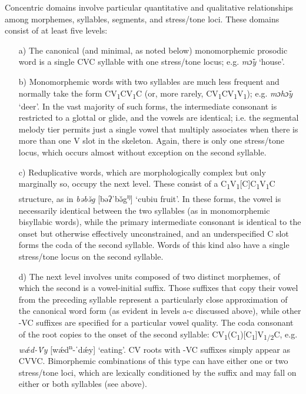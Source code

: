\documentclass[output=paper]{langscibook}
\begin{document}
Concentric domains involve particular quantitative and qualitative relationships among morphemes, syllables, segments, and stress/tone loci. These domains consist of at least five levels:
\begin{enumerate}
    \item[a)] The canonical (and minimal, as noted below) monomorphemic prosodic word is a single CVC syllable with one stress/tone locus; e.g. \textit{mɔ̌y} `house'.
    
    \item[b)] Monomorphemic words with two syllables are much less frequent and normally take the form CV\textsubscript{1}CV\textsubscript{1}C (or, more rarely, CV\textsubscript{1}CV\textsubscript{1}V\textsubscript{1}); e.g. \textit{mɔhɔ̌y} `deer'. In the vast majority of such forms, the intermediate consonant is restricted to a glottal or glide, and the vowels are identical; i.e. the segmental melody tier permits just a single vowel that multiply associates when there is more than one V slot in the skeleton. Again, there is only one stress/tone locus, which occurs almost without exception on the second syllable.
    
    \item[c)] Reduplicative words, which are morphologically complex but only mar\-gin\-ally so, occupy the next level. These consist of a C\textsubscript{1}V\textsubscript{1}[C]C\textsubscript{1}V\textsubscript{1}C structure, as in \textit{bǝbǝ̌g} [bǝʔˈbǝ̌g\textsuperscript{ŋ}] `cubiu fruit'. In these forms, the vowel is necessarily identical between the two syllables (as in monomorphemic bisyllabic words), while the primary intermediate consonant is identical to the onset but otherwise effectively unconstrained, and an underspecified C slot forms the coda of the second syllable. Words of this kind also have a single stress/tone locus on the second syllable.
    
    \item[d)] The next level involves units composed of two distinct morphemes, of which the second is a vowel-initial suffix. Those suffixes that copy their vowel from the preceding syllable represent a particularly close approximation of the canonical word form (as evident in levels a-c discussed above), while other -VC suffixes are specified for a particular vowel quality. The coda consonant of the root copies to the onset of the second syllable: CV\textsubscript{1}(C\textsubscript{1})[C\textsubscript{1}]V\textsubscript{1/2}C, e.g. \textit{w\'{æ}d-\'{V}y} [w\'{æ}d\textsuperscript{n}{}-ˈd\'{æ}y] `eating'. CV roots with -VC suffixes simply appear as CVVC. Bimorphemic combinations of this type can have either one or two stress/tone loci, which are lexically conditioned by the suffix and may fall on either or both syllables (see above).
    

\end{enumerate}
\end{document}
